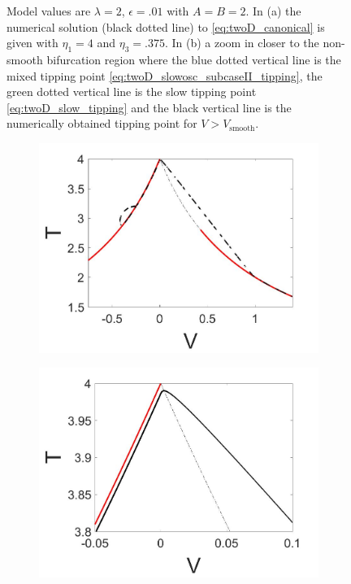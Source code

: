\begin{figure}[H]
\begin{subfigure}{.5\textwidth}
  \caption{}
\end{subfigure}
\caption{ Model values are $\lambda=2$, $\epsilon=.01$ with $A=B=2$. In (a) the numerical solution (black dotted line) to \eqref{eq:twoD_canonical} is given with $\eta_1=4$ and $\eta_3=.375$. In (b) a zoom in closer to the non-smooth bifurcation region where the blue dotted vertical line is the mixed tipping point \eqref{eq:twoD_slowosc_subcaseII_tipping}, the green dotted vertical line is the slow tipping point \eqref{eq:twoD_slow_tipping} and the black vertical line is the numerically obtained tipping point for $V>V_{\text{smooth}}$.}
\label{fig:twoD_slowosc_Vnumerics_large}
\end{figure}

\begin{figure}[H]
\centering
\begin{subfigure}{.5\textwidth}
  \centering
  \includegraphics[width=\linewidth]{twoD/slowosc_Tplot_large.jpg}
  \caption{}
\end{subfigure}%
\begin{subfigure}{.5\textwidth}
  \centering
  \includegraphics[width=\linewidth]{twoD/slowosc_Tplot_large_zoom.jpg}

\end{subfigure}
\end{figure}
